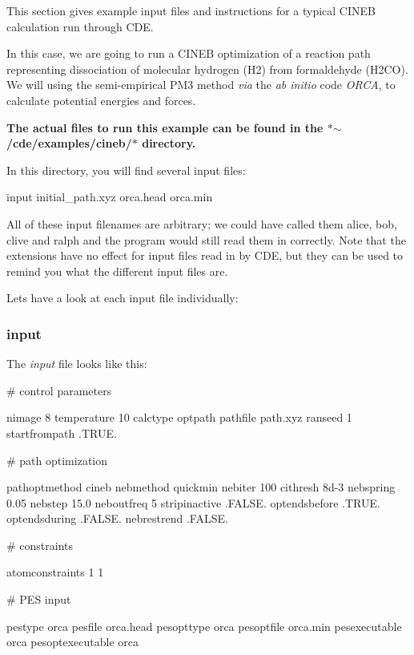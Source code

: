 This section gives example input files and instructions for a typical C\+I\+N\+EB calculation run through C\+DE.

In this case, we are going to run a C\+I\+N\+EB optimization of a reaction path representing dissociation of molecular hydrogen (H2) from formaldehyde (H2\+CO). We will using the semi-\/empirical P\+M3 method {\itshape via} the {\itshape ab initio} code {\itshape O\+R\+CA}, to calculate potential energies and forces.

{\bfseries The actual files to run this example can be found in the $\ast$$\sim$/cde/examples/cineb/$\ast$ directory.}

In this directory, you will find several input files\+: \begin{DoxyVerb}  input
  initial_path.xyz
  orca.head
  orca.min
\end{DoxyVerb}


All of these input filenames are arbitrary; we could have called them alice, bob, clive and ralph and the program would still read them in correctly. Note that the extensions have no effect for input files read in by C\+DE, but they can be used to remind you what the different input files are.

Let\textquotesingle{}s have a look at each input file individually\+:

\subsubsection*{input}

The {\itshape input} file looks like this\+: \begin{DoxyVerb}  # control parameters

  nimage 8
  temperature 10
  calctype optpath
  pathfile path.xyz
  ranseed  1
  startfrompath   .TRUE.

  # path optimization

  pathoptmethod cineb
  nebmethod quickmin
  nebiter 100
  cithresh 8d-3
  nebspring 0.05
  nebstep  15.0
  neboutfreq 5
  stripinactive .FALSE.
  optendsbefore .TRUE.
  optendsduring .FALSE.
  nebrestrend .FALSE.

  # constraints

  atomconstraints 1
  1

  # PES input

  pestype  orca
  pesfile   orca.head
  pesopttype  orca
  pesoptfile orca.min
  pesexecutable orca
  pesoptexecutable orca
\end{DoxyVerb}



